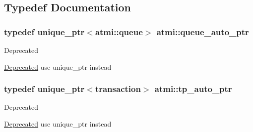 \subsection{Typedef Documentation}
\hypertarget{namespaceatmi_a9eff55eddc901da817f1b087613b18cc}{
\subsubsection[{queue\+\_\+auto\+\_\+ptr}]{\setlength{\rightskip}{0pt plus 5cm}typedef unique\+\_\+ptr$<${\bf atmi\+::queue}$>$ {\bf atmi\+::queue\+\_\+auto\+\_\+ptr}}}\label{namespaceatmi_a9eff55eddc901da817f1b087613b18cc}
\begin{DoxyRefDesc}{Deprecated}
\item[\hyperlink{deprecated__deprecated000003}{Deprecated}]use unique\+\_\+ptr instead \end{DoxyRefDesc}
\hypertarget{namespaceatmi_a4a71d76e59908eb5ec5e53269c2742b5}{
\subsubsection[{tp\+\_\+auto\+\_\+ptr}]{\setlength{\rightskip}{0pt plus 5cm}typedef unique\+\_\+ptr$<${\bf transaction}$>$ {\bf atmi\+::tp\+\_\+auto\+\_\+ptr}}}\label{namespaceatmi_a4a71d76e59908eb5ec5e53269c2742b5}
\begin{DoxyRefDesc}{Deprecated}
\item[\hyperlink{deprecated__deprecated000002}{Deprecated}]use unique\+\_\+ptr instead \end{DoxyRefDesc}


